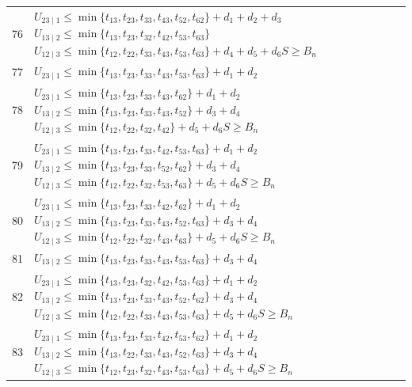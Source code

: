 \documentclass[a4paper,11pt]{amsart}
\numberwithin{equation}{section}
\theoremstyle{definition}
\theoremstyle{remark}
\begin{document}
{\begin{longtable}{@{}r>{\raggedright\arraybackslash}p{12.9cm}@{}}
76 & \(U_{23\mid 1}\leq \min\{t_{13},t_{23},t_{33},t_{43},t_{52},t_{62}\}+d_{1}+d_{2}+d_{3}\)\newline \(U_{13\mid 2}\leq \min\{t_{13},t_{23},t_{32},t_{42},t_{53},t_{63}\}\)\newline \(U_{12\mid 3}\leq \min\{t_{12},t_{22},t_{33},t_{43},t_{53},t_{63}\}+d_{4}+d_{5}+d_{6}\)\newline \(S\geq B_n\)\\[3pt]
77 & \(U_{23\mid 1}\leq \min\{t_{13},t_{23},t_{33},t_{43},t_{53},t_{63}\}+d_{1}+d_{2}\)\\[3pt]
78 & \(U_{23\mid 1}\leq \min\{t_{13},t_{23},t_{33},t_{43},t_{62}\}+d_{1}+d_{2}\)\newline \(U_{13\mid 2}\leq \min\{t_{13},t_{23},t_{33},t_{43},t_{52}\}+d_{3}+d_{4}\)\newline \(U_{12\mid 3}\leq \min\{t_{12},t_{22},t_{32},t_{42}\}+d_{5}+d_{6}\)\newline \(S\geq B_n\)\\[3pt]
79 & \(U_{23\mid 1}\leq \min\{t_{13},t_{23},t_{33},t_{42},t_{53},t_{63}\}+d_{1}+d_{2}\)\newline \(U_{13\mid 2}\leq \min\{t_{13},t_{23},t_{33},t_{52},t_{62}\}+d_{3}+d_{4}\)\newline \(U_{12\mid 3}\leq \min\{t_{12},t_{22},t_{32},t_{53},t_{63}\}+d_{5}+d_{6}\)\newline \(S\geq B_n\)\\[3pt]
80 & \(U_{23\mid 1}\leq \min\{t_{13},t_{23},t_{33},t_{42},t_{62}\}+d_{1}+d_{2}\)\newline \(U_{13\mid 2}\leq \min\{t_{13},t_{23},t_{33},t_{43},t_{52},t_{63}\}+d_{3}+d_{4}\)\newline \(U_{12\mid 3}\leq \min\{t_{12},t_{22},t_{32},t_{43},t_{63}\}+d_{5}+d_{6}\)\newline \(S\geq B_n\)\\[3pt]
81 & \(U_{13\mid 2}\leq \min\{t_{13},t_{23},t_{33},t_{43},t_{53},t_{63}\}+d_{3}+d_{4}\)\\[3pt]
82 & \(U_{23\mid 1}\leq \min\{t_{13},t_{23},t_{32},t_{42},t_{53},t_{63}\}+d_{1}+d_{2}\)\newline \(U_{13\mid 2}\leq \min\{t_{13},t_{23},t_{33},t_{43},t_{52},t_{62}\}+d_{3}+d_{4}\)\newline \(U_{12\mid 3}\leq \min\{t_{12},t_{22},t_{33},t_{43},t_{53},t_{63}\}+d_{5}+d_{6}\)\newline \(S\geq B_n\)\\[3pt]
83 & \(U_{23\mid 1}\leq \min\{t_{13},t_{23},t_{33},t_{42},t_{53},t_{62}\}+d_{1}+d_{2}\)\newline \(U_{13\mid 2}\leq \min\{t_{13},t_{22},t_{33},t_{43},t_{52},t_{63}\}+d_{3}+d_{4}\)\newline \(U_{12\mid 3}\leq \min\{t_{12},t_{23},t_{32},t_{43},t_{53},t_{63}\}+d_{5}+d_{6}\)\newline \(S\geq B_n\)\\[3pt]
\end{longtable}
}
\end{document}
